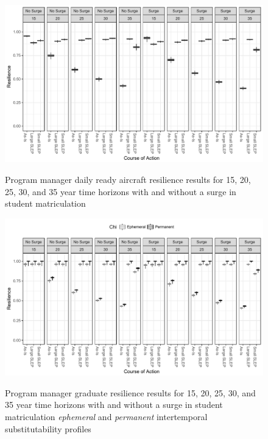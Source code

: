 \documentclass[preprint,12pt]{elsarticle}
\begin{document}
\begin{landscape}
\begin{figure}[h]
  \begin{center}
    \includegraphics[width=8.2in]{PMAoTH}
  \end{center}
\begin{quote}
  \caption[Program manager aircraft resilience results]{Program
    manager daily ready aircraft resilience results for 15, 20, 25, 30, and 35 
    year time horizons with and without a surge in student
    matriculation
  \label{f:PMAoTH}}
\end{quote}
\end{figure}
\end{landscape}

\begin{landscape}
\begin{figure}[h]
  \begin{center}
    \includegraphics[width=8.2in]{PMGradTH}
  \end{center}
\begin{quote}
  \caption[Program manager graduate resilience results]{Program
    manager graduate resilience results for 15, 20, 25, 30, and 35 
    year time horizons with and without a surge in student
    matriculation \emph{ephemeral} and \emph{permanent} intertemporal
    substitutability profiles
  \label{f:PMGradTH}}
\end{quote}
\end{figure}
\end{landscape}
\end{document}
